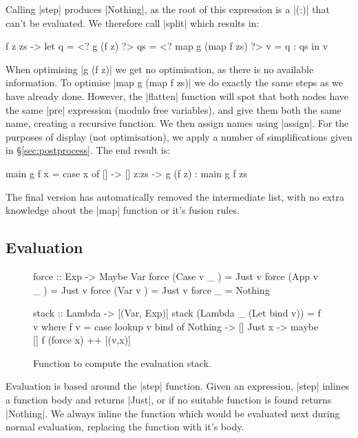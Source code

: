 \documentclass[draft]{sigplanconf}
\begin{document}
Calling |step| produces |Nothing|, as the root of this expression is a |(:)| that can't be evaluated. We therefore call |split| which results in:

\begin{code}
\g f z zs ->  let  q = <? g (f z) ?>
                   qs = <? map g (map f zs) ?>
                   v = q : qs
              in   v
\end{code}

When optimising |g (f z)| we get no optimisation, as there is no available information. To optimise |map g (map f zs)| we do exactly the same steps as we have already done. However, the |flatten| function will spot that both nodes have the same |pre| expression (modulo free variables), and give them both the same name, creating a recursive function. We then assign names using |assign|. For the purposes of display (not optimisation), we apply a number of simplifications given in \S\ref{sec:postprocess}. The end result is:

\begin{code}
main g f x = case  x of
                   []    -> []
                   z:zs  -> g (f z) : main g f zs
\end{code}

The final version has automatically removed the intermediate list, with no extra knowledge about the |map| function or it's fusion rules.

\subsection{Evaluation}
\label{sec:eval}

\begin{figure}
\begin{code}
force :: Exp -> Maybe Var
force (Case  v _  )  = Just v
force (App   v _  )  = Just v
force (Var   v    )  = Just v
force _              = Nothing

stack :: Lambda -> [(Var, Exp)]
stack (Lambda _ (Let bind v)) = f v
    where f v = case  lookup v bind of
                      Nothing  -> []
                      Just x   -> maybe [] f (force x) ++ [(v,x)]
\end{code}
\caption{Function to compute the evaluation stack.}
\label{fig:stack}
\end{figure}

Evaluation is based around the |step| function. Given an expression, |step| inlines a function body and returns |Just|, or if no suitable function is found returns |Nothing|. We always inline the function which would be evaluated next during normal evaluation, replacing the function with it's body.
\end{document}
